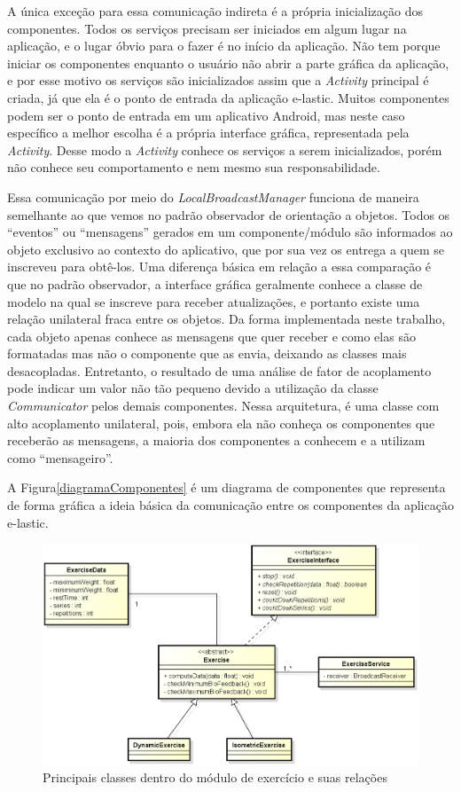A única exceção para essa comunicação indireta é a própria inicialização dos componentes. Todos os serviços precisam ser iniciados em algum lugar na aplicação, e o lugar óbvio para o fazer é no início da aplicação. Não tem porque iniciar os componentes enquanto o usuário não abrir a parte gráfica da aplicação, e por esse motivo os serviços são inicializados assim que a \textit{Activity} principal é criada, já que ela é o ponto de entrada da aplicação e-lastic. Muitos componentes podem ser o ponto de entrada em um aplicativo Android, mas neste caso específico a melhor escolha é a própria interface gráfica, representada pela \textit{Activity}. Desse modo a \textit{Activity} conhece os serviços a serem inicializados, porém não conhece seu comportamento e nem mesmo sua responsabilidade.

Essa comunicação por meio do \textit{LocalBroadcastManager} funciona de maneira semelhante ao que vemos no padrão observador de orientação a objetos. Todos os ``eventos'' ou ``mensagens'' gerados em um componente/módulo são informados ao objeto exclusivo ao contexto do aplicativo, que por sua vez os entrega a quem se inscreveu para obtê-los. Uma diferença básica em relação a essa comparação é que no padrão observador, a interface gráfica geralmente conhece a classe de modelo na qual se inscreve para receber atualizações, e portanto existe uma relação unilateral fraca entre os objetos. Da forma implementada neste trabalho, cada objeto apenas conhece as mensagens que quer receber e como elas são formatadas mas não o componente que as envia, deixando as classes mais desacopladas. Entretanto, o resultado de uma análise de fator de acoplamento pode indicar um valor não tão pequeno devido a utilização da classe \textit{Communicator} pelos demais componentes. Nessa arquitetura, é uma classe com alto acoplamento unilateral, pois, embora ela não conheça os componentes que receberão as mensagens, a maioria dos componentes a conhecem e a utilizam como ``mensageiro''. 

A Figura\ref{diagramaComponentes} é um diagrama de componentes que representa de forma gráfica a ideia básica da comunicação entre os componentes da aplicação e-lastic.

\begin{figure}[!htb]
\centering
\includegraphics [keepaspectratio=true,scale=0.60]{figuras/diagramaExercicios.eps}
\caption{Principais classes dentro do módulo de exercício e suas relações}
\label{diagramaExercicios}
\end{figure}

